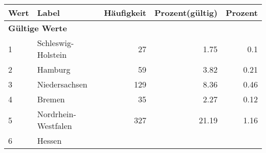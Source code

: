      \begin{longtable}{lXrrr}
     \toprule
     \textbf{Wert} & \textbf{Label} & \textbf{Häufigkeit} & \textbf{Prozent(gültig)} & \textbf{Prozent} \\
     \endhead
     \midrule
     \multicolumn{5}{l}{\textbf{Gültige Werte}}\\

     1 &
     \multicolumn{1}{X}{ Schleswig-Holstein   } &


       \num{27} &
       \num[round-mode=places,round-precision=2]{1.75} &
         \num[round-mode=places,round-precision=2]{0.1} \\

     2 &
     \multicolumn{1}{X}{ Hamburg   } &


       \num{59} &
       \num[round-mode=places,round-precision=2]{3.82} &
         \num[round-mode=places,round-precision=2]{0.21} \\

     3 &
     \multicolumn{1}{X}{ Niedersachsen   } &


       \num{129} &
       \num[round-mode=places,round-precision=2]{8.36} &
         \num[round-mode=places,round-precision=2]{0.46} \\

     4 &
     \multicolumn{1}{X}{ Bremen   } &


       \num{35} &
       \num[round-mode=places,round-precision=2]{2.27} &
         \num[round-mode=places,round-precision=2]{0.12} \\

     5 &
     \multicolumn{1}{X}{ Nordrhein-Westfalen   } &


       \num{327} &
       \num[round-mode=places,round-precision=2]{21.19} &
         \num[round-mode=places,round-precision=2]{1.16} \\

     6 &
     \multicolumn{1}{X}{ Hessen   } &



\end{longtable}
